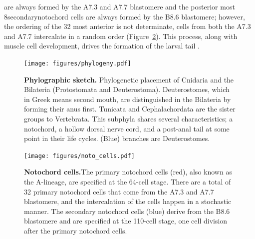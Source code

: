 are always formed by the A7.3 and A7.7 blastomere and the posterior most 8\textemdash secondary\textemdash notochord cells are always formed by the B8.6 blastomere; however, the ordering of the 32 most anterior is not determinate, cells from both the A7.3 and A7.7 intercalate in a random order (Figure~\ref{fig:noto_cells})\cite{nishida_cell_1983,nishida_cell_1985,miyamoto_formation_1985, swalla_mechanisms_1993,kourakis_one-dimensional_2014}. This process, along with muscle cell development, drives the formation of the larval tail \cite{miyamoto_formation_1985, jeffery_factors_1992,swalla_mechanisms_1993}.
\begin{figure}[tbp]
\centering
\texttt{[image: figures/phylogeny.pdf]}

\caption{\textbf{Phylographic sketch.} Phylogenetic placement of Cnidaria and the Bilateria (Protostomata and Deuterostoma). Deuterostomes, which in Greek means second mouth, are distinguished in the Bilateria by forming their anus first. Tunicata and Cephalachordata are the sister groups to Vertebrata. This subphyla shares several characteristics; a notochord, a hollow dorsal nerve cord, and a post-anal tail at some point in their life cycles. (Blue) branches are Deuterostomes.}
\label{fig:phylog}
\end{figure}

\begin{figure}[thbp]
\centering
\texttt{[image: figures/noto\_cells.pdf]}
\caption{\textbf{Notochord cells.}The primary notochord cells (red), also known as the A-lineage, are specified at the 64-cell stage. There are a total of 32 primary notochord cells that come from the A7.3 and A7.7 blastomere, and the intercalation of the cells happen in a stochastic manner. The secondary notochord cells (blue) derive from the B8.6 blastomere and are specified at the 110-cell stage, one cell division after the primary notochord cells.}
\label{fig:noto_cells}
\end{figure}

